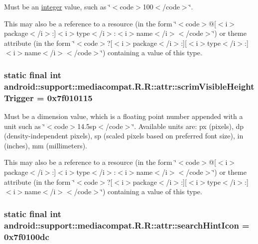 Must be an \hyperlink{classandroid_1_1support_1_1mediacompat_1_1_r_1_1integer}{integer} value, such as \char`\"{}$<$code$>$100$<$/code$>$\char`\"{}. 

This may also be a reference to a resource (in the form \char`\"{}$<$code$>$@\mbox{[}$<$i$>$package$<$/i$>$:\mbox{]}$<$i$>$type$<$/i$>$:$<$i$>$name$<$/i$>$$<$/code$>$\char`\"{}) or theme attribute (in the form \char`\"{}$<$code$>$?\mbox{[}$<$i$>$package$<$/i$>$:\mbox{]}\mbox{[}$<$i$>$type$<$/i$>$:\mbox{]}$<$i$>$name$<$/i$>$$<$/code$>$\char`\"{}) containing a value of this type. \hypertarget{classandroid_1_1support_1_1mediacompat_1_1_r_1_1attr_7764868c83c35bd5efce3998f4fbaffe}{
\subsubsection[{scrimVisibleHeightTrigger}]{\setlength{\rightskip}{0pt plus 5cm}static final int android::support::mediacompat.R.R::attr::scrimVisibleHeightTrigger = 0x7f010115}}
\label{classandroid_1_1support_1_1mediacompat_1_1_r_1_1attr_7764868c83c35bd5efce3998f4fbaffe}


Must be a dimension value, which is a floating point number appended with a unit such as \char`\"{}$<$code$>$14.5sp$<$/code$>$\char`\"{}. Available units are: px (pixels), dp (density-independent pixels), sp (scaled pixels based on preferred font size), in (inches), mm (millimeters). 

This may also be a reference to a resource (in the form \char`\"{}$<$code$>$@\mbox{[}$<$i$>$package$<$/i$>$:\mbox{]}$<$i$>$type$<$/i$>$:$<$i$>$name$<$/i$>$$<$/code$>$\char`\"{}) or theme attribute (in the form \char`\"{}$<$code$>$?\mbox{[}$<$i$>$package$<$/i$>$:\mbox{]}\mbox{[}$<$i$>$type$<$/i$>$:\mbox{]}$<$i$>$name$<$/i$>$$<$/code$>$\char`\"{}) containing a value of this type. \hypertarget{classandroid_1_1support_1_1mediacompat_1_1_r_1_1attr_d100ef1642d1cb17410f7c1b50796afd}{
\subsubsection[{searchHintIcon}]{\setlength{\rightskip}{0pt plus 5cm}static final int android::support::mediacompat.R.R::attr::searchHintIcon = 0x7f0100dc}}
\label{classandroid_1_1support_1_1mediacompat_1_1_r_1_1attr_d100ef1642d1cb17410f7c1b50796afd}


